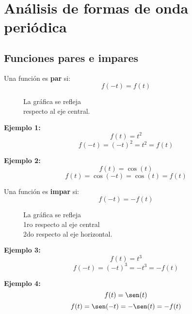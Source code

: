 \chapter{Análisis de formas de onda periódica}

\section{Funciones pares e impares}
Una función es \textbf{par} si:
\begin{equation}
    f(-t)=f(t)
\end{equation}
\begin{figure}[H]
    \centering
    
    \caption{La gráfica se refleja \\respecto al eje central.}
\end{figure}

\textbf{Ejemplo 1:}
\begin{equation*}
    f(t)=t^2
\end{equation*}
\begin{equation*}
    f(-t)={(-t)}^2=t^2=f(t)
\end{equation*}

\textbf{Ejemplo 2:}
\begin{equation*}
    f(t)=\cos(t)
\end{equation*}
\begin{equation*}
    f(t)=\cos(-t)=\cos(t)=f(t)
\end{equation*}

Una función es \textbf{impar} si:
\begin{equation}
    f(-t)=-f(t)
\end{equation}
\begin{figure}[H]
    \centering
    
    \caption{La gráfica se refleja \\
    1ro respecto al eje central\\
    2do respecto al eje horizontal.}
\end{figure}

\textbf{Ejemplo 3:}
\begin{equation*}
    f(t)=t^3
\end{equation*}
\begin{equation*}
    f(-t)={(-t)}^3=-t^3=-f(t)
\end{equation*}

\textbf{Ejemplo 4:}
\begin{equation*}
    f(t)=\sen(t)
\end{equation*}
\begin{equation*}
    f(t)=\sen(-t)=-\sen(t)=-f(t)
\end{equation*}

